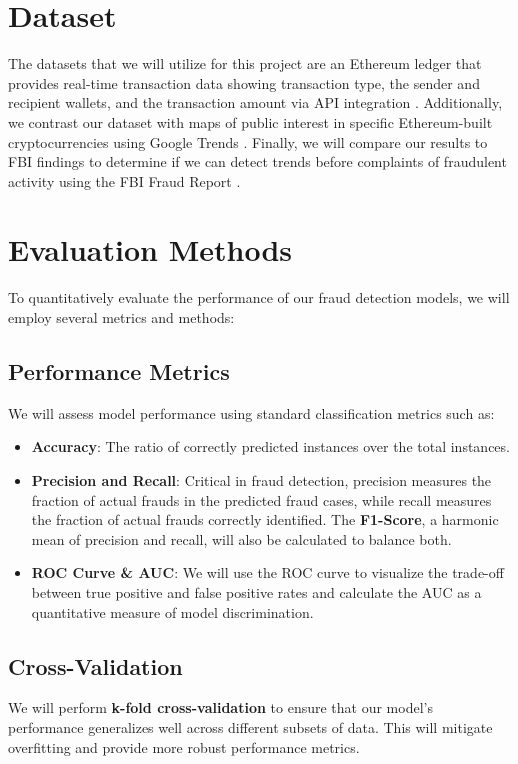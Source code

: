 \documentclass[sigconf]{acmart}
\begin{document}
\section{Dataset}
The datasets that we will utilize for this project are an Ethereum ledger that provides real-time transaction data showing transaction type, the sender and recipient wallets, and the transaction amount via API integration \cite{etherscan}. Additionally, we contrast our dataset with maps of public interest in specific Ethereum-built cryptocurrencies using Google Trends \cite{googletrends}. Finally, we will compare our results to FBI findings to determine if we can detect trends before complaints of fraudulent activity using the FBI Fraud Report \cite{FBIFraudReport2023}.

\section{Evaluation Methods}
To quantitatively evaluate the performance of our fraud detection models, we will employ several metrics and methods:

\subsection{Performance Metrics}
We will assess model performance using standard classification metrics such as:
\begin{itemize}
    \item \textbf{Accuracy}: The ratio of correctly predicted instances over the total instances.
    \item \textbf{Precision and Recall}: Critical in fraud detection, precision measures the fraction of actual frauds in the predicted fraud cases, while recall measures the fraction of actual frauds correctly identified. The \textbf{F1-Score}, a harmonic mean of precision and recall, will also be calculated to balance both.
    \item \textbf{ROC Curve \& AUC}: We will use the ROC curve to visualize the trade-off between true positive and false positive rates and calculate the AUC as a quantitative measure of model discrimination.
\end{itemize}

\subsection{Cross-Validation}
We will perform \textbf{k-fold cross-validation} to ensure that our model's performance generalizes well across different subsets of data. This will mitigate overfitting and provide more robust performance metrics.
\end{document}
